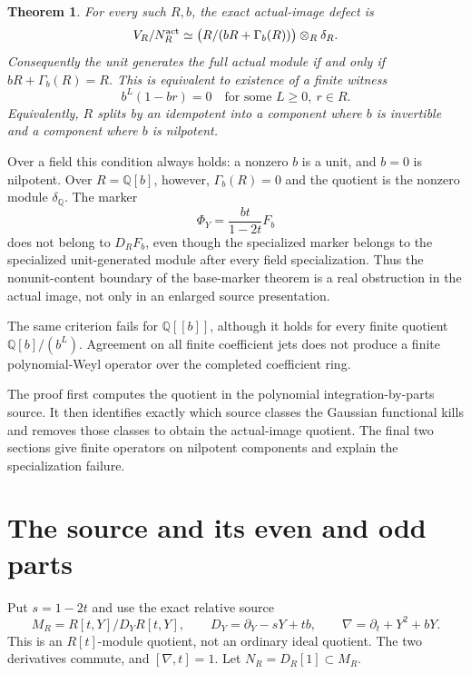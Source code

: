 \documentclass[11pt]{article}
\newtheorem{theorem}{Theorem}[section]
\theoremstyle{definition}\newtheorem{definition}[theorem]{Definition}
\theoremstyle{remark}\newtheorem{remark}[theorem]{Remark}
\begin{document}
\begin{theorem}\label{thm:allrings}
For every such $R,b$, the exact actual-image defect is
\begin{equation}\label{eq:defect}
 V_R/N_R^{\rm act}\simeq
     \bigl(R/(bR+\Gamma_b(R))\bigr)\otimes_R\delta_R.
\end{equation}
Consequently the unit generates the full actual module if and
only if $bR+\Gamma_b(R)=R$. This is equivalent to existence of
a finite witness
\begin{equation}\label{eq:stabilization}
 b^L(1-br)=0\quad\text{for some }L\ge0,\ r\in R.
\end{equation}
Equivalently, $R$ splits by an idempotent into a component where
$b$ is invertible and a component where $b$ is nilpotent.
\end{theorem}

Over a field this condition always holds: a nonzero $b$ is a unit,
and $b=0$ is nilpotent. Over $R=\mathbb Q[b]$, however,
$\Gamma_b(R)=0$ and the quotient is the nonzero module
$\delta_{\mathbb Q}$. The marker
\[
 \Phi_Y=\frac{bt}{1-2t}F_b
\]
does not belong to $D_RF_b$, even though the specialized marker belongs to the specialized unit-generated
module after every field specialization. Thus the nonunit-content boundary of the
base-marker theorem is a real obstruction in the actual image,
not only in an enlarged source presentation.

The same criterion fails for $\mathbb Q[[b]]$, although it holds
for every finite quotient $\mathbb Q[b]/(b^L)$. Agreement on all
finite coefficient jets does not produce a finite polynomial-Weyl
operator over the completed coefficient ring.

The proof first computes the quotient in the polynomial
integration-by-parts source. It then identifies exactly which source
classes the Gaussian functional kills and removes those classes to obtain
the actual-image quotient. The final two sections give finite operators
on nilpotent components and explain the specialization failure.

\section{The source and its even and odd parts}

Put $s=1-2t$ and use the exact relative source
\[
 M_R=R[t,Y]/D_YR[t,Y],\qquad
 D_Y=\partial_Y-sY+tb,\qquad
 \nabla=\partial_t+Y^2+bY.
\]
This is an $R[t]$-module quotient, not an ordinary ideal quotient.
The two derivatives commute, and $[\nabla,t]=1$. Let
$N_R=D_R[1]\subset M_R$.
\end{document}
